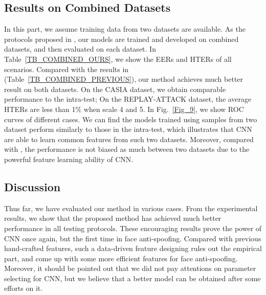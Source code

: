 \documentclass[letterpaper, 10 pt, conference]{ieeeconf}
\begin{document}
\subsection{Results on Combined Datasets}

In this part, we assume training data from two datasets are available. As the protocols proposed in \cite{Face_Anti_Spoofing_Pereira_2013}, our models are trained and developed on combined datasets, and then evaluated on each dataset. In Table~\ref{TB_COMBINED_OURS}, we show the EERs and HTERs of all scenarios. Compared with the results in \cite{Face_Anti_Spoofing_Pereira_2013} (Table~\ref{TB_COMBINED_PREVIOUS}), our method achieves much better result on both datasets. On the CASIA dataset, we obtain comparable performance to the intra-test; On the REPLAY-ATTACK dataset, the average HTERs are less than 1\% when scale  4 and 5. In Fig.~\ref{Fig_9}, we show ROC curves of different cases. We can find the models trained using samples from two dataset perform similarly to those in the intra-test, which illustrates that CNN are able to learn common features from such two datasets. Moreover, compared with \cite{Face_Anti_Spoofing_Pereira_2013}, the performance is not biased as much between two datasets due to the powerful feature learning ability of CNN.

\subsection{Discussion}

Thus far, we have evaluated our method in various cases. From the experimental results, we show that the proposed method has achieved much better performance in all testing protocols. These encouraging results prove the power of CNN once again, but the first time in face anti-spoofing. Compared with previous hand-crafted features, such a data-driven feature designing rules out the empirical part, and come up with some more efficient features for face anti-spoofing. Moreover, it should be pointed out that we did not pay attentions on parameter selecting for CNN, but we believe that a better model can be obtained after some efforts on it. 
\end{document}
